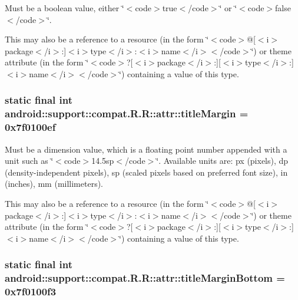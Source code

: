 Must be a boolean value, either \char`\"{}$<$code$>$true$<$/code$>$\char`\"{} or \char`\"{}$<$code$>$false$<$/code$>$\char`\"{}. 

This may also be a reference to a resource (in the form \char`\"{}$<$code$>$@\mbox{[}$<$i$>$package$<$/i$>$:\mbox{]}$<$i$>$type$<$/i$>$:$<$i$>$name$<$/i$>$$<$/code$>$\char`\"{}) or theme attribute (in the form \char`\"{}$<$code$>$?\mbox{[}$<$i$>$package$<$/i$>$:\mbox{]}\mbox{[}$<$i$>$type$<$/i$>$:\mbox{]}$<$i$>$name$<$/i$>$$<$/code$>$\char`\"{}) containing a value of this type. \hypertarget{classandroid_1_1support_1_1compat_1_1_r_1_1attr_89b72376b3109b1bb2fbabfffc617a03}{
\subsubsection[{titleMargin}]{\setlength{\rightskip}{0pt plus 5cm}static final int android::support::compat.R.R::attr::titleMargin = 0x7f0100ef}}
\label{classandroid_1_1support_1_1compat_1_1_r_1_1attr_89b72376b3109b1bb2fbabfffc617a03}


Must be a dimension value, which is a floating point number appended with a unit such as \char`\"{}$<$code$>$14.5sp$<$/code$>$\char`\"{}. Available units are: px (pixels), dp (density-independent pixels), sp (scaled pixels based on preferred font size), in (inches), mm (millimeters). 

This may also be a reference to a resource (in the form \char`\"{}$<$code$>$@\mbox{[}$<$i$>$package$<$/i$>$:\mbox{]}$<$i$>$type$<$/i$>$:$<$i$>$name$<$/i$>$$<$/code$>$\char`\"{}) or theme attribute (in the form \char`\"{}$<$code$>$?\mbox{[}$<$i$>$package$<$/i$>$:\mbox{]}\mbox{[}$<$i$>$type$<$/i$>$:\mbox{]}$<$i$>$name$<$/i$>$$<$/code$>$\char`\"{}) containing a value of this type. \hypertarget{classandroid_1_1support_1_1compat_1_1_r_1_1attr_72c97c3f8246d13b2a810b26a244b095}{
\subsubsection[{titleMarginBottom}]{\setlength{\rightskip}{0pt plus 5cm}static final int android::support::compat.R.R::attr::titleMarginBottom = 0x7f0100f3}}
\label{classandroid_1_1support_1_1compat_1_1_r_1_1attr_72c97c3f8246d13b2a810b26a244b095}


